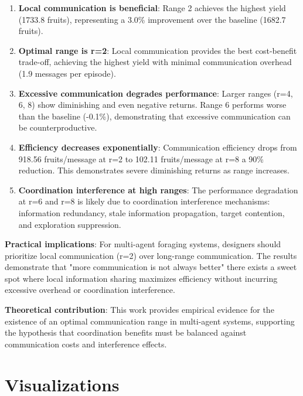 \begin{enumerate}
    \item \textbf{Local communication is beneficial}: Range 2 achieves the highest yield (1733.8 fruits), representing a 3.0\% improvement over the baseline (1682.7 fruits).

    \item \textbf{Optimal range is r=2}: Local communication provides the best cost-benefit trade-off, achieving the highest yield with minimal communication overhead (1.9 messages per episode).

    \item \textbf{Excessive communication degrades performance}: Larger ranges (r=4, 6, 8) show diminishing and even negative returns. Range 6 performs worse than the baseline (-0.1\%), demonstrating that excessive communication can be counterproductive.

    \item \textbf{Efficiency decreases exponentially}: Communication efficiency drops from 918.56 fruits/message at r=2 to 102.11 fruits/message at r=8 a 90\% reduction. This demonstrates severe diminishing returns as range increases.

    \item \textbf{Coordination interference at high ranges}: The performance degradation at r=6 and r=8 is likely due to coordination interference mechanisms: information redundancy, stale information propagation, target contention, and exploration suppression.
\end{enumerate}

\textbf{Practical implications}: For multi-agent foraging systems, designers should prioritize local communication (r=2) over long-range communication. The results demonstrate that "more communication is not always better" there exists a sweet spot where local information sharing maximizes efficiency without incurring excessive overhead or coordination interference.

\textbf{Theoretical contribution}: This work provides empirical evidence for the existence of an optimal communication range in multi-agent systems, supporting the hypothesis that coordination benefits must be balanced against communication costs and interference effects.

\vspace{12cm}

\section{Visualizations}

